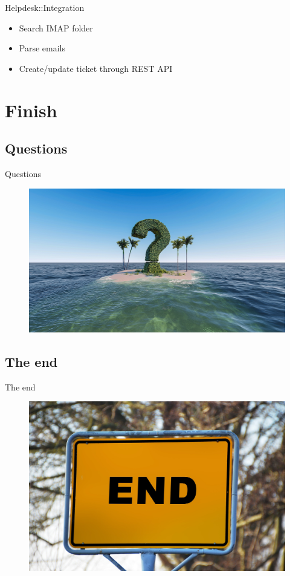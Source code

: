 \begin{frame}{Helpdesk::Integration}
  \begin{itemize}
  \item Search IMAP folder
  \item Parse emails
  \item Create/update ticket through REST API
  \end{itemize}
\end{frame}

\section{Finish}

\subsection{Questions}

\begin{frame}{Questions}
  \begin{figure}[!ht]
     \centering
     \includegraphics[width=0.9\linewidth]{img/question-mark-3255140_1920.jpg}
  \end{figure}
\end{frame}

\subsection{The end}

\begin{frame}{The end}
  \begin{figure}[!ht]
     \centering
     \includegraphics[width=0.8\linewidth]{img/town-sign-1158385_1920.jpg}
  \end{figure}
\end{frame}



